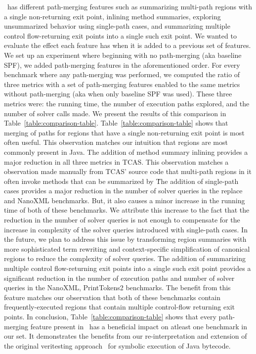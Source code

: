 \tool\ has different path-merging features such as summarizing multi-path regions with a single non-returning exit
point, inlining method summaries, exploring unsummarized behavior using single-path cases, and summarizing multiple
control flow-returning exit points into a single such exit point.
%
We wanted to evaluate the effect each feature has when it is added to a previous set of features.
%
We set up an experiment where beginning with no path-merging (aka baseline SPF), we added path-merging features in the
aforementioned order.
%
For every benchmark where any path-merging was performed, we computed the ratio of three metrics with a set of
path-merging features enabled to the same metrics without path-merging (aka when only baseline SPF was used).
%
These three metrics were: the running time, the number of execution paths explored, and the number of solver calls made.
%
We present the results of this comparison in Table~\ref{table:comparison-table}.
%
Table~\ref{table:comparison-table} shows that merging of paths for regions that have a single non-returning exit point
is most often useful.
%
This observation matches our intuition that regions are most commonly present in Java.
%
The addition of method summary inlining provides a major reduction in all three metrics in TCAS.
%
This observation matches a observation made manually from TCAS' source code that multi-path regions in it often invoke
methods that can be summarized by \tool\.
%
The addition of single-path cases provides a major reduction in the number of solver queries in the replace and
NanoXML benchmarks.
%
But, it also causes a minor increase in the running time of both of these benchmarks.
%
We attribute this increase to the fact that the reduction in the number of solver queries is not enough to compensate
for the increase in complexity of the solver queries introduced with single-path cases.
%
In the future, we plan to address this issue by transforming region summaries with more sophisticated term rewriting
and context-specific simplification of canonical regions to reduce the complexity of solver queries.
%
The addition of summarizing multiple control flow-returning exit points into a single such exit point provides a
significant reduction in the number of execution paths and number of solver queries in the NanoXML, PrintTokens2
benchmarks.
%
The benefit from this feature matches our observation that both of these benchmarks contain frequently-executed
regions that contain multiple control-flow returning exit points.
%
In conclusion, Table~\ref{table:comparison-table} shows that every path-merging feature present in \tool\ has a
beneficial impact on atleast one benchmark in our set.
%
It demonstrates the benefits from our re-interpretation and extension of the original veritesting approach~\cite{veritesting}
for symbolic execution of Java bytecode.